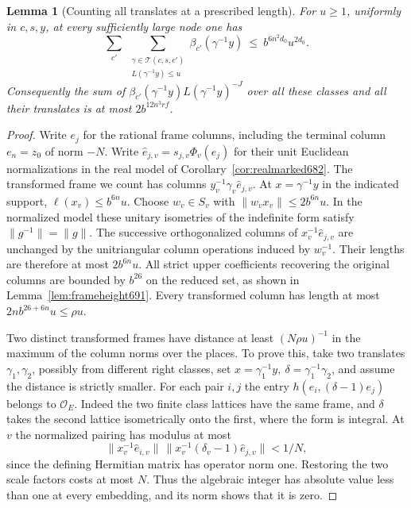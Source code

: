\documentclass[a4paper,11pt]{article}
\newtheorem{lemma}[proposition]{Lemma}
\theoremstyle{definition}
\theoremstyle{remark}
\numberwithin{equation}{section}
\begin{document}
\begin{lemma}[Counting all translates at a prescribed length]\leavevmode
\label{lem:framepacking700}
For \(u\ge1\), uniformly in \(c,s,y\), at every sufficiently large
node one has
\[
 \sum_{c'}\ \sum_{\substack{\gamma\in\mathcal T(c,s,c')\\
                         L(\gamma^{-1}y)\le u}}
       \beta_{c'}(\gamma^{-1}y)
             \ \le\ b^{6n^2d_0}u^{2d_0}.
\]
Consequently the sum of \(\beta_{c'}(\gamma^{-1}y)
L(\gamma^{-1}y)^{-J}\) over all these classes and all their
translates is at most \(2b^{12n^3rf}\).
\end{lemma}
\begin{proof}
Write \(e_j\) for the rational frame columns, including the
terminal column \(e_n=z_0\) of norm \(-N\). Write
\(\widehat e_{j,v}=s_{j,v}\Phi_v(e_j)\) for their unit Euclidean
normalizations in the real model of Corollary~\ref{cor:realmarked682}.
The transformed frame we count has columns
\(y_v^{-1}\gamma_v\widehat e_{j,v}\). At \(x=\gamma^{-1}y\)
in the indicated support, \(\ell(x_v)\le b^{6n}u\). Choose
\(w_v\in S_v\) with \(\|w_vx_v\|\le2b^{6n}u\). In the normalized
model these unitary isometries of the indefinite form satisfy
\(\|g^{-1}\|=\|g\|\). The successive orthogonalized columns of
\(x_v^{-1}\widehat e_{j,v}\) are unchanged by the unitriangular
column operations induced by \(w_v^{-1}\). Their lengths are
therefore at most \(2b^{6n}u\). All strict upper coefficients
recovering the original columns are bounded by \(b^{26}\) on
the reduced set, as shown in Lemma~\ref{lem:frameheight691}.
Every transformed column has length at most
\(2nb^{26+6n}u\le\rho u\).

Two distinct transformed frames have distance at least
\((N\rho u)^{-1}\) in the maximum of the column norms over the
places. To prove this, take two translates \(\gamma_1,\gamma_2\),
possibly from different right classes, set
\(x=\gamma_1^{-1}y,\ \delta=\gamma_1^{-1}\gamma_2\), and assume
the distance is strictly smaller. For each pair \(i,j\) the
entry \(h(e_i,(\delta-1)e_j)\) belongs to \(\mathcal O_E\).
Indeed the two finite class lattices have the same frame, and
\(\delta\) takes the second lattice isometrically onto the first,
where the form is integral. At \(v\) the normalized pairing has
modulus at most
\[
 \|x_v^{-1}\widehat e_{i,v}\|\,
 \|x_v^{-1}(\delta_v-1)\widehat e_{j,v}\|<1/N ,
\]
since the defining Hermitian matrix has operator norm one.
Restoring the two scale factors costs at most \(N\).
Thus the algebraic integer has absolute value less than one at
every embedding, and its norm shows that it is zero.


\end{proof}
\end{document}
